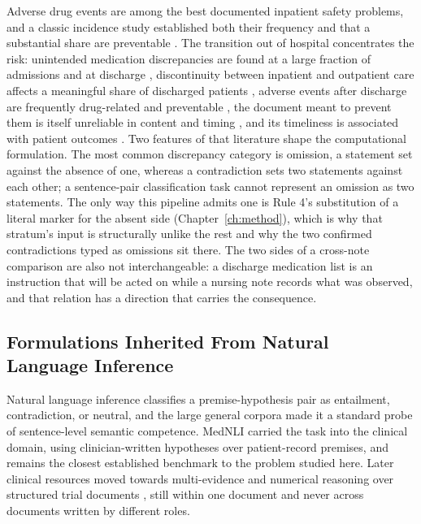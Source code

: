 Adverse drug events are among the best documented inpatient safety problems, and a classic
incidence study established both their frequency and that a substantial share
are preventable \citep{bates1995ade}. The transition out of hospital concentrates the risk: unintended medication
discrepancies are found at a large fraction of admissions \citep{cornish2005discrepancies} and at
discharge \citep{wong2008reconciliation}, discontinuity between inpatient and outpatient care affects
a meaningful share of discharged patients \citep{moore2003discontinuity}, adverse events after
discharge are frequently drug-related and preventable \citep{forster2003adverse}, the document meant
to prevent them is itself unreliable in content and timing \citep{kripalani2007deficits}, and its
timeliness is associated with patient outcomes \citep{li2013timeliness}. Two features of that
literature shape the computational formulation. The most common discrepancy category is omission, a statement set against the absence of one, whereas a contradiction sets two statements against each other; a sentence-pair classification task cannot represent an omission as two statements. The only
way this pipeline admits one is Rule 4's substitution of a literal marker for the absent side
(Chapter~\ref{ch:method}), which is why that stratum's input is structurally unlike the rest and
why the two confirmed contradictions typed as omissions sit there. The two sides of a cross-note comparison are also not interchangeable: a discharge medication
list is an instruction that will be acted on while a nursing note records what was observed, and
that relation has a direction that carries the consequence.

\subsection{Formulations Inherited From Natural Language Inference}

Natural language inference classifies a premise-hypothesis pair as entailment, contradiction, or neutral, and the large general corpora \citep{bowman2015snli,williams2018mnli} made it a standard
probe of sentence-level semantic competence. MedNLI \citep{romanov2018mednli} carried the task into
the clinical domain, using clinician-written hypotheses over patient-record premises, and remains the
closest established benchmark to the problem studied here. Later clinical resources moved towards
multi-evidence and numerical reasoning over structured trial documents \citep{jullien2023nli4ct},
still within one document and never across documents written by different roles.

